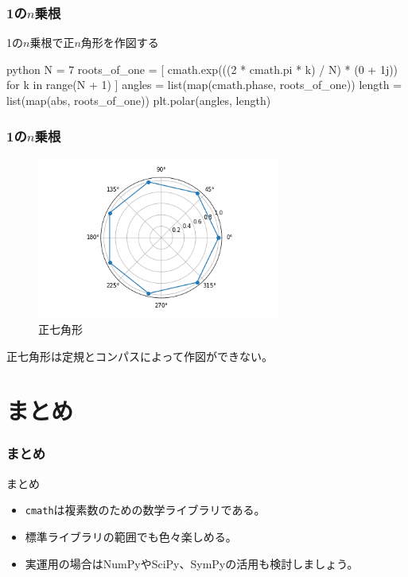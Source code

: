 \documentclass[dvipdfmx,11pt,notheorems]{beamer}
\theoremstyle{definition}
\begin{document}
\begin{frame}[fragile]\frametitle{1の$n$乗根}
\begin{exampleblock}{1の$n$乗根で正$n$角形を作図する}
\begin{pygments}{python}
N = 7
roots_of_one = [
    cmath.exp(((2 * cmath.pi * k) / N) * (0 + 1j)) 
    for k in range(N + 1)
]
angles = list(map(cmath.phase, roots_of_one))
length = list(map(abs, roots_of_one))
plt.polar(angles, length)
\end{pygments}
\end{exampleblock}

\end{frame}

\begin{frame}[fragile]\frametitle{1の$n$乗根}

\begin{figure}
  \centering
  \includegraphics[width=8cm]{heptagon.png}
  \caption{正七角形}
\end{figure}
正七角形は定規とコンパスによって作図ができない。
\end{frame}

\section{まとめ}

\begin{frame}[fragile]\frametitle{まとめ}
\begin{block}{まとめ}
\begin{itemize}
\item \texttt{cmath}は複素数のための数学ライブラリである。
\item 標準ライブラリの範囲でも色々楽しめる。
\item 実運用の場合はNumPyやSciPy、SymPyの活用も検討しましょう。
\end{itemize}
\end{block}
\end{frame}
\end{document}
